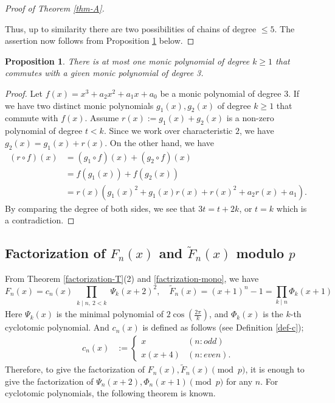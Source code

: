 \documentclass[a4paper, 11pt]{amsart}
\numberwithin{equation}{section}
\newtheorem{prop}[thm]{Proposition}
\theoremstyle{definition}
\begin{document}
\begin{proof}[Proof of Theorem \ref{thm-A}]
\begin{enumerate}
\end{enumerate}
Thus, up to similarity there are two possibilities of chains of degree $\leq 5$.
The assertion now follows from Proposition \ref{prop-A2} below.
\end{proof}

\begin{prop}\label{prop-A2}
There is at most one monic polynomial of degree $k\geq 1$ that commutes with a given monic polynomial of degree 3.
\end{prop}

\begin{proof}
Let $f(x)=x^3+a_2x^2+a_1x+a_0$ be a monic polynomial of degree 3.
If we have two distinct monic polynomials $g_1(x), g_2(x)$ of degree $k\geq 1$ that commute with $f(x)$.
Assume $r(x):=g_1(x)+g_2(x)$ is a non-zero polynomial of degree $t<k$.
Since we work over characteristic $2$, we have $g_2(x)=g_1(x)+r(x)$.
On the other hand, we have
\begin{align*}
(r\circ f)(x)
&=(g_1\circ f)(x)+(g_2\circ f)(x)\\
&=f(g_1(x))+f(g_2(x))\\
&=r(x)(g_1(x)^2+g_1(x)r(x)+r(x)^2+a_2r(x)+a_1).
\end{align*}
By comparing the degree of both sides, we see that $3t=t+2k$, or $t=k$ which is a contradiction.
\end{proof}



\subsection{Factorization of $F_n(x)$ and $\tilde{F}_n(x)$ modulo $p$}
From Theorem \ref{factorization-T}(2) and \eqref{factrization-mono}, we have
\[
F_n(x)=c_n(x)\prod_{\substack{k \mid n,\ 2 < k}} \Psi_k(x+2)^2
,\quad 
\tilde{F}_n(x)=(x+1)^n-1 = \prod_{k \mid n} \Phi_k(x+1)
\]
Here $\Psi_k(x)$ is the minimal polynomial of $2\cos(\frac{2\pi}k)$, and $\Phi_k(x)$ is the $k$-th cyclotomic polynomial.
And $c_n(x)$ is defined as follows (see Definition \ref{def-c});
\begin{align*}
c_n(x)&:=
\begin{cases}
x& (n : odd)\\
x(x + 4) & (n : even).
\end{cases}
\end{align*}
Therefore, to give the factorization of $F_n(x), \tilde{F}_n(x)\pmod p$, it is enough to give the factorization of $\Psi_n(x+2), \Phi_n(x+1) \pmod p$ for any $n$.
For cyclotomic polynomials, the following theorem is known.
\end{document}
